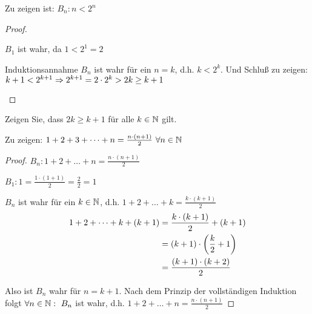 \begin{beispiel}
    Zu zeigen ist: $B_n: n < 2^{n}$
    \begin{proof}
        ~\\
        \begin{induktionsanfang}
            $B_1$ ist wahr, da $1<2^{1}=2$
        \end{induktionsanfang}
        \begin{induktionsschritt}
            Induktionsannahme $B_n$ ist wahr für ein $n=k$, d.h. $k<2^k$. Und Schluß zu zeigen: $k+1<2^{k+1} \Rightarrow{} 2^{k+1} = 2\cdot 2^{k} > 2k \geq k+1$\qedhere
        \end{induktionsschritt}
    \end{proof}
\end{beispiel}

\begin{uebung}
    Zeigen Sie, dass $2k\geq k+1$ für alle $k\in\mathbb{N}$ gilt.
\end{uebung}

\begin{beispiel}
    Zu zeigen: $1+2+3+\dots+n= \frac{n\cdot(n+1)}{2}~\forall n\in\mathbb{N}$
    \begin{proof}
        $B_n: 1+2+\dots+n = \frac{n\cdot(n+1)}{2}$\\
        \begin{induktionsanfang}
            $B_1: 1=\frac{1\cdot(1+1)}{2}=\frac{2}{2}=1$
        \end{induktionsanfang}
        \begin{induktionsschritt}
            $B_n$ ist wahr für ein $k\in\mathbb{N}$, d.h. $1+2+\dots+k=\frac{k\cdot(k+1)}{2}$
            \begin{align*}
                1+2+\dots+k+(k+1) &= \frac{k\cdot(k+1)}{2}+(k+1)\\
                &= (k+1)\cdot\left(\frac{k}{2}+1\right)\\
                &= \frac{(k+1)\cdot(k+2)}{2}
            \end{align*}
        \end{induktionsschritt}
        \noindent Also ist $B_n$ wahr für $n=k+1$. Nach dem Prinzip der vollständigen Induktion folgt $\forall n\in\mathbb{N}:~B_n$ ist wahr, d.h. $1+2+\dots+n=\frac{n\cdot(n+1)}{2}$\qedhere
    \end{proof}
\end{beispiel}

\newpage

